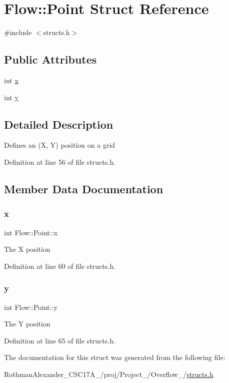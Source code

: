 \hypertarget{struct_flow_1_1_point}{}\section{Flow\+:\+:Point Struct Reference}
\label{struct_flow_1_1_point}


{\ttfamily \#include $<$structs.\+h$>$}

\subsection*{Public Attributes}
\begin{DoxyCompactItemize}
\item 
int \hyperlink{struct_flow_1_1_point_ada2d7891653124b023647a1d4852e034}{x}
\item 
int \hyperlink{struct_flow_1_1_point_ae5eebbaf5523c4eb55fee6dc4770e3d5}{y}
\end{DoxyCompactItemize}


\subsection{Detailed Description}
Defines an (X, Y) position on a grid 

Definition at line 56 of file structs.\+h.



\subsection{Member Data Documentation}
\hypertarget{struct_flow_1_1_point_ada2d7891653124b023647a1d4852e034}{}\label{struct_flow_1_1_point_ada2d7891653124b023647a1d4852e034} 
\subsubsection{\texorpdfstring{x}{x}}
{\footnotesize\ttfamily int Flow\+::\+Point\+::x}

The X position 

Definition at line 60 of file structs.\+h.

\hypertarget{struct_flow_1_1_point_ae5eebbaf5523c4eb55fee6dc4770e3d5}{}\label{struct_flow_1_1_point_ae5eebbaf5523c4eb55fee6dc4770e3d5} 
\subsubsection{\texorpdfstring{y}{y}}
{\footnotesize\ttfamily int Flow\+::\+Point\+::y}

The Y position 

Definition at line 65 of file structs.\+h.



The documentation for this struct was generated from the following file\+:\begin{DoxyCompactItemize}
\item 
Rothman\+Alexander\+\_\+\+C\+S\+C17\+A\+\_/proj/\+Project\+\_/\+Overflow\+\_/\hyperlink{structs_8h}{structs.\+h}\end{DoxyCompactItemize}
